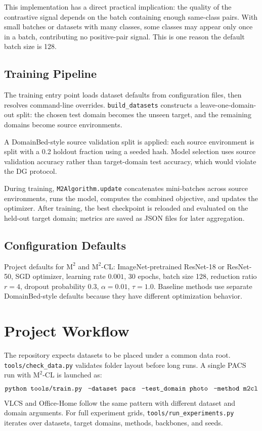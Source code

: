 \documentclass[11pt,a4paper]{article}
\newcommand{\method}{\texorpdfstring{$\mathrm{M}^2$\textup{-CL}}{M2-CL}}
\newcommand{\base}{\texorpdfstring{$\mathrm{M}^2$}{M2}}
\newcommand{\codepath}[1]{\texttt{\small #1}}
\begin{document}
This implementation has a direct practical implication: the quality of the
contrastive signal depends on the batch containing enough same-class pairs.  With
small batches or datasets with many classes, some classes may appear only once in
a batch, contributing no positive-pair signal.  This is one reason the default
batch size is 128.

\subsection{Training Pipeline}

The training entry point loads dataset defaults from configuration files, then
resolves command-line overrides.  \codepath{build\_datasets} constructs a
leave-one-domain-out split: the chosen test domain becomes the unseen target, and
the remaining domains become source environments.

A DomainBed-style source validation split is applied: each source environment is
split with a 0.2 holdout fraction using a seeded hash.  Model selection uses
source validation accuracy rather than target-domain test accuracy, which would
violate the DG protocol.

During training, \codepath{M2Algorithm.update} concatenates mini-batches across
source environments, runs the model, computes the combined objective, and updates
the optimizer.  After training, the best checkpoint is reloaded and evaluated on
the held-out target domain; metrics are saved as JSON files for later aggregation.

\subsection{Configuration Defaults}

Project defaults for \base{} and \method{}: ImageNet-pretrained ResNet-18 or
ResNet-50, SGD optimizer, learning rate $0.001$, 30 epochs, batch size 128,
reduction ratio $r=4$, dropout probability 0.3, $\alpha=0.01$, $\tau=1.0$.
Baseline methods use separate DomainBed-style defaults because they have
different optimization behavior.

\section{Project Workflow}

The repository expects datasets to be placed under a common data root.
\codepath{tools/check\_data.py} validates folder layout before long runs.  A
single PACS run with \method{} is launched as:
\[
  \texttt{python tools/train.py \;--dataset pacs \;--test\_domain photo
  \;--method m2cl}
\]
VLCS and Office-Home follow the same pattern with different dataset and domain
arguments.  For full experiment grids, \codepath{tools/run\_experiments.py}
iterates over datasets, target domains, methods, backbones, and seeds.
\end{document}
